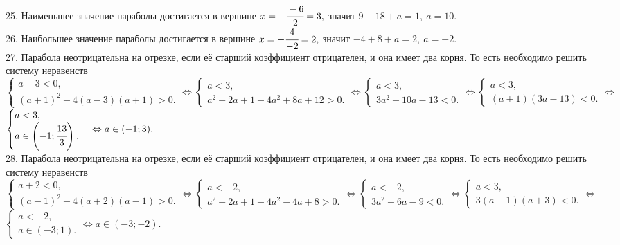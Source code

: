 25. Наименьшее значение параболы достигается в вершине $x=-\cfrac{-6}{2}=3,$ значит $9-18+a=1,\ a=10.$\\
26. Наибольшее значение параболы достигается в вершине $x=-\cfrac{4}{-2}=2,$ значит $-4+8+a=2,\ a=-2.$\\
27. Парабола неотрицательна на отрезке, если её старший коэффициент отрицателен, и она имеет два корня. То есть необходимо решить систему неравенств $\begin{cases} a-3<0,\\ (a+1)^2-4(a-3)(a+1)>0.\end{cases}\Leftrightarrow\begin{cases} a<3,\\ a^2+2a+1-4a^2+8a+12>0.\end{cases}\Leftrightarrow
\begin{cases} a<3,\\ 3a^2-10a-13<0.\end{cases}\Leftrightarrow\begin{cases} a<3,\\ (a+1)(3a-13)<0.\end{cases}\Leftrightarrow$\\$
\begin{cases} a<3,\\ a\in\left(-1;\cfrac{13}{3}\right).\end{cases}\Leftrightarrow a\in(-1;3).$\\
28. Парабола неотрицательна на отрезке, если её старший коэффициент отрицателен, и она имеет два корня. То есть необходимо решить систему неравенств $\begin{cases} a+2<0,\\ (a-1)^2-4(a+2)(a-1)>0.\end{cases}\Leftrightarrow\begin{cases} a<-2,\\ a^2-2a+1-4a^2-4a+8>0.\end{cases}\Leftrightarrow
\begin{cases} a<-2,\\ 3a^2+6a-9<0.\end{cases}\Leftrightarrow\begin{cases} a<3,\\ 3(a-1)(a+3)<0.\end{cases}\Leftrightarrow$\\$
\begin{cases} a<-2,\\ a\in\left(-3;1\right).\end{cases}\Leftrightarrow a\in(-3;-2).$\\
